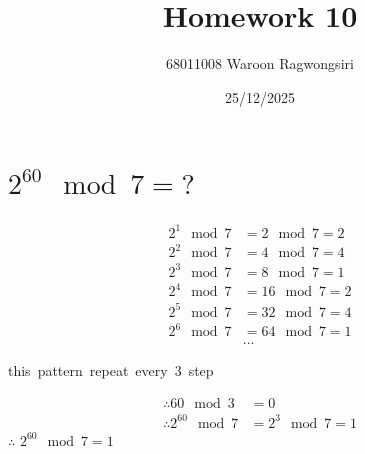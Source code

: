 \documentclass{article}
\title{Homework 10}
\author{68011008 Waroon Ragwongsiri}
\date{25/12/2025}
\begin{document}
\maketitle

{\small
\section{$2^{60} \mod 7 = ?$}
}
\begin{align}
	2^{1} \mod 7 &= 2 \mod 7 = 2 \\
	2^{2} \mod 7 &= 4 \mod 7 = 4 \\
	2^{3} \mod 7 &= 8 \mod 7 = 1 \\
	2^{4} \mod 7 &= 16 \mod 7 = 2 \\
	2^{5} \mod 7 &= 32 \mod 7 = 4 \\
	2^{6} \mod 7 &= 64 \mod 7 = 1 \\
	&...
\end{align}
\begin{center}
	this\ pattern\ repeat\ every\ 3\ step \\
\end{center}
\begin{align}
	\therefore 60 \mod 3 &= 0 \\
	\therefore 2^{60} \mod 7 &= 2^{3} \mod 7 = 1
\end{align}
\subitem
$\therefore$ $2^{60} \mod 7 = 1$
\end{document}

